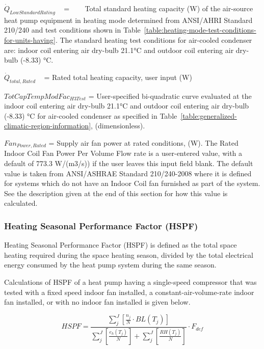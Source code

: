 \({\dot Q_{LowStandardRating}}\) ~ = ~~~ Total standard heating capacity (W) of the air-source heat pump equipment in heating mode determined from ANSI/AHRI Standard 210/240 and test conditions shown in Table~\ref{table:heating-mode-test-conditions-for-units-having}. The standard heating test conditions for air-cooled condenser are: indoor coil entering air dry-bulb 21.1°C and outdoor coil entering air dry-bulb (-8.33) °C.

\({\dot Q_{total,Rated}}\) ~ = Rated total heating capacity, user input (W)

\(TotCapTempModFa{c_{H3Test}}\) = User-specified bi-quadratic curve evaluated at the indoor coil entering air dry-bulb 21.1°C and outdoor coil entering air dry-bulb (-8.33) °C for air-cooled condenser as specified in Table~\ref{table:generalized-climatic-region-information}, (dimensionless).

\(Fa{n_{Power,Rated}}\) = Supply air fan power at rated conditions, (W). The Rated Indoor Coil Fan Power Per Volume Flow rate is a user-entered value, with a default of 773.3 W/(m3/s)) if the user leaves this input field blank. The default value is taken from ANSI/ASHRAE Standard 210/240-2008 where it is defined for systems which do not have an Indoor Coil fan furnished as part of the system. See the description given at the end of this section for how this value is calculated.

\subsubsection{Heating Seasonal Performance Factor (HSPF)}\label{heating-seasonal-performance-factor-hspf}

Heating Seasonal Performance Factor (HSPF) is defined as the total space heating required during the space heating season, divided by the total electrical energy consumed by the heat pump system during the same season.

Calculations of HSPF of a heat pump having a single-speed compressor that was tested with a fixed speed indoor fan installed, a constant-air-volume-rate indoor fan installed, or with no indoor fan installed is given below.

\begin{equation}
HSPF = \frac{{\sum\limits_j^J {\left[ {\frac{{{n_j}}}{N} \cdot BL({T_j})} \right]} }}{{\sum\limits_j^J {\left[ {\frac{{{e_h}({T_j})}}{N}} \right]}  + \sum\limits_j^J {\left[ {\frac{{RH({T_j})}}{N}} \right]} }} \cdot {F_{def}}
\end{equation}

